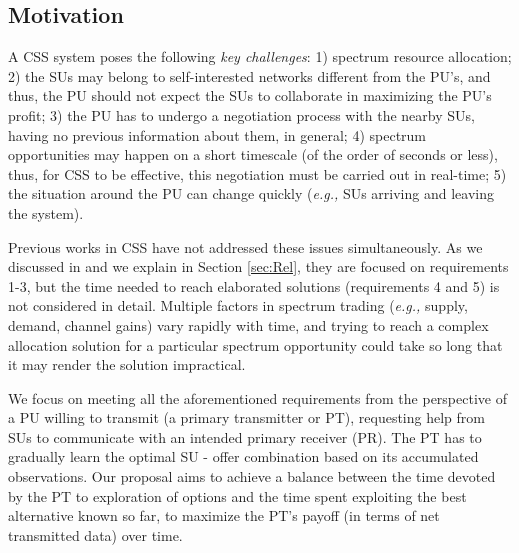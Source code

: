 \subsection{Motivation}
A CSS system poses the following \textit{key challenges}: 1) spectrum resource allocation; 2) the SUs may belong to self-interested networks different from the PU's, and thus, the PU should not expect the SUs to collaborate in maximizing the PU's profit; 3) the PU has to undergo a negotiation process with the nearby SUs, having no previous information about them, in general; 4) spectrum opportunities may happen on a short timescale (of the order of seconds or less), thus, for CSS to be effective, this negotiation must be carried out in real-time; 5) the situation around the PU can change quickly (\textit{e.g.,} SUs arriving and leaving the system). 

Previous works in CSS have not addressed these issues simultaneously. As we discussed in \cite{ref:Mario2014} and we explain in Section \ref{sec:Rel}, they are focused on requirements 1-3, but the time needed to reach elaborated solutions (requirements 4 and 5) is not considered in detail. 
Multiple factors in spectrum trading (\textit{e.g.,} supply, demand, channel gains) vary rapidly with time, and trying to reach a complex allocation solution for a particular spectrum opportunity could take so long that it may render the solution impractical.

We focus on meeting all the aforementioned requirements from the perspective of a PU willing to transmit (a primary transmitter or PT), requesting help from SUs to communicate with an intended primary receiver (PR). The PT has to gradually learn the optimal SU - offer combination based on its accumulated observations. Our proposal aims to achieve a balance between the time devoted by the PT to exploration of options and the time spent exploiting the best alternative known so far, to maximize the PT's payoff (in terms of net transmitted data) over time.
